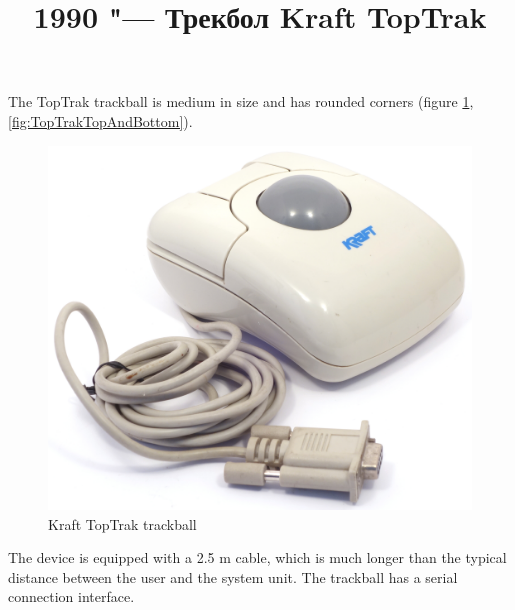 \documentclass[11pt, a4paper]{article}
\begin{document}
\title{1990 "--- Трекбол Kraft TopTrak}
\date{}
\maketitle

The TopTrak trackball is medium in size and has rounded corners (figure \ref{fig:TopTrakPic}, \ref{fig:TopTrakTopAndBottom}).

\begin{figure}[h]
    \centering
    \includegraphics[scale=0.45]{1990_kraft_toptrack/pic_60.jpg}
    \caption{Kraft TopTrak trackball}
    \label{fig:TopTrakPic}
\end{figure}

The device is equipped with a 2.5 m cable, which is much longer than the typical distance between the user and the system unit. The trackball has a serial connection interface.
\end{document}
